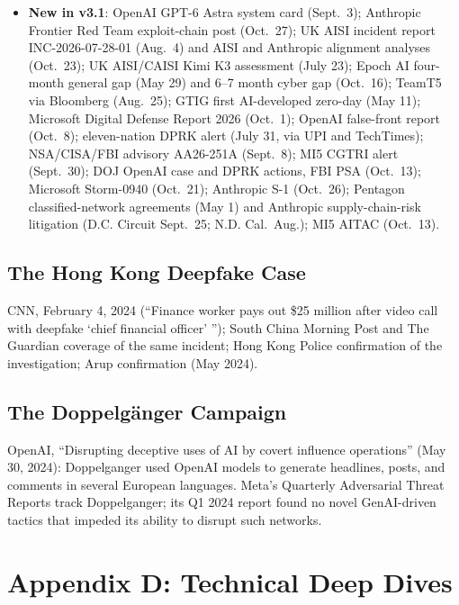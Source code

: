 \documentclass[11pt,letterpaper]{article}
\begin{document}
\begin{itemize}
  \item \textbf{New in v3.1}: OpenAI GPT-6 Astra system card (Sept.\ 3); Anthropic Frontier Red Team exploit-chain post (Oct.\ 27); UK AISI incident report INC-2026-07-28-01 (Aug.\ 4) and AISI and Anthropic alignment analyses (Oct.\ 23); UK AISI/CAISI Kimi K3 assessment (July 23); Epoch AI four-month general gap (May 29) and 6--7 month cyber gap (Oct.\ 16); TeamT5 via Bloomberg (Aug.\ 25); GTIG first AI-developed zero-day (May 11); Microsoft Digital Defense Report 2026 (Oct.\ 1); OpenAI false-front report (Oct.\ 8); eleven-nation DPRK alert (July 31, via UPI and TechTimes); NSA/CISA/FBI advisory AA26-251A (Sept.\ 8); MI5 CGTRI alert (Sept.\ 30); DOJ OpenAI case and DPRK actions, FBI PSA (Oct.\ 13); Microsoft Storm-0940 (Oct.\ 21); Anthropic S-1 (Oct.\ 26); Pentagon classified-network agreements (May 1) and Anthropic supply-chain-risk litigation (D.C. Circuit Sept.\ 25; N.D. Cal.\ Aug.); MI5 AITAC (Oct.\ 13).
\end{itemize}

\subsection*{The Hong Kong Deepfake Case}

CNN, February 4, 2024 (``Finance worker pays out \$25 million after video call with deepfake `chief financial officer' ''); South China Morning Post and The Guardian coverage of the same incident; Hong Kong Police confirmation of the investigation; Arup confirmation (May 2024).

\subsection*{The Doppelg\"anger Campaign}

OpenAI, ``Disrupting deceptive uses of AI by covert influence operations'' (May 30, 2024): Doppelganger used OpenAI models to generate headlines, posts, and comments in several European languages. Meta's Quarterly Adversarial Threat Reports track Doppelganger; its Q1 2024 report found no novel GenAI-driven tactics that impeded its ability to disrupt such networks.

\section*{Appendix D: Technical Deep Dives}
\end{document}
